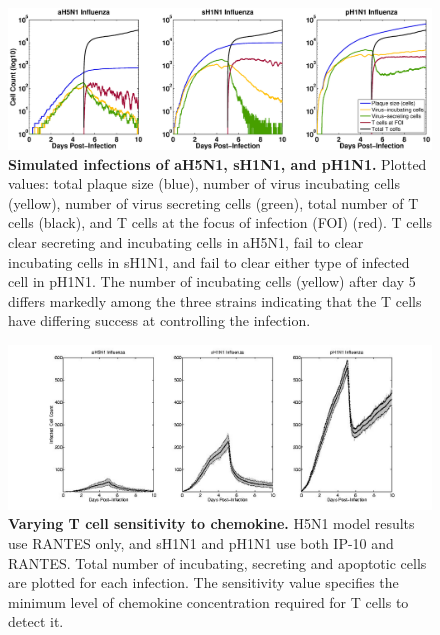 \documentclass[10pt]{article}
\begin{document}
\begin{figure}[!ht]
\begin{center}
\includegraphics[width=\textwidth]{Figure_6}
 \end{center}
\caption{{\bf Simulated infections of aH5N1, sH1N1, and pH1N1.} Plotted values: total plaque size (blue), number of virus incubating cells (yellow), number of virus secreting cells (green), total number of T cells (black), and T cells at the focus of infection (FOI) (red).  T cells clear secreting and incubating cells in aH5N1, fail to clear incubating cells in sH1N1, and fail to clear either type of infected cell in pH1N1.  The number of incubating cells (yellow) after day 5 differs markedly among the three strains indicating that the T cells have differing success at controlling the infection.} 
 \label{fig:plaquesize}
\end{figure}

\setcounter{figure}{0}
\renewcommand{\thefigure}{S\arabic{figure}}

\begin{figure}[ht!]
\begin{center}
\includegraphics[width=\textwidth]{Figure_S1}
 \end{center}
\caption{{\bf Varying T cell sensitivity to chemokine.}  H5N1 model results use RANTES  only, and sH1N1 and pH1N1 use both IP-10 and RANTES. Total number of incubating, secreting and apoptotic cells are plotted for each infection.  The sensitivity value specifies the minimum level of chemokine concentration required for T cells to detect it.} 
\end{figure}
\end{document}
